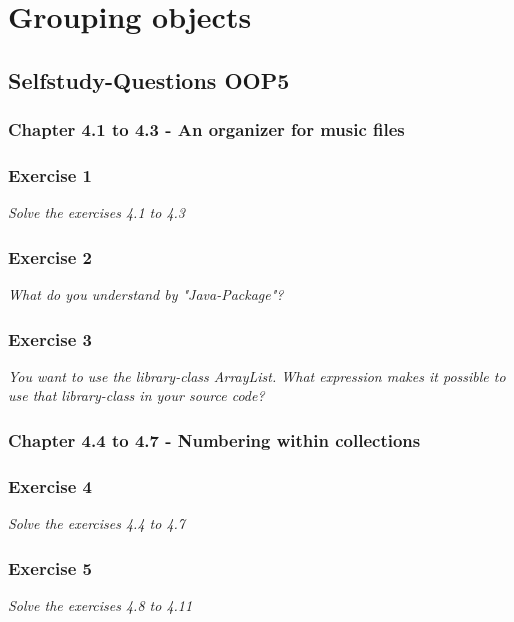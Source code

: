 \section{Grouping objects}


\subsection{Selfstudy-Questions OOP5}

\subsubsection{Chapter 4.1 to 4.3 - An organizer for music files}

\subsubsection*{Exercise 1}
\textit{Solve the exercises 4.1 to 4.3}\\

\subsubsection*{Exercise 2}
\textit{What do you understand by "Java-Package"?}\\

\subsubsection*{Exercise 3}
\textit{You want to use the library-class ArrayList. What expression makes it
possible to use that library-class in your source code?}\\

\subsubsection{Chapter 4.4 to 4.7 - Numbering within collections}

\subsubsection*{Exercise 4}
\textit{Solve the exercises 4.4 to 4.7}\\

\subsubsection*{Exercise 5}
\textit{Solve the exercises 4.8 to 4.11}\\

